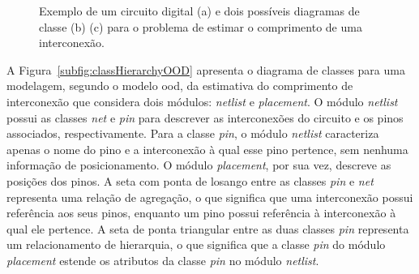 \begin{figure}[ht]
    \centering
    
    \hspace{0.5cm}
    \caption[Exemplo de um circuito digital]{Exemplo de um circuito digital (a) e dois possíveis diagramas de classe (b) (c) para o problema de estimar o comprimento de uma interconexão.}
    \label{fig:circuit_example}
\end{figure}

A Figura~\ref{subfig:classHierarchyOOD} apresenta o diagrama de classes para uma modelagem, segundo o modelo \ac{ood}, da estimativa do comprimento de interconexão que considera dois módulos: \textit{netlist} e \textit{placement}.
O módulo \textit{netlist} possui as classes \textit{net} e \textit{pin} para descrever as interconexões do circuito e os pinos associados, respectivamente.
Para a classe \textit{pin}, o módulo \textit{netlist} caracteriza apenas o nome do pino e a interconexão à qual esse pino pertence, sem nenhuma informação de posicionamento.
O módulo \textit{placement}, por sua vez, descreve as posições dos pinos.
A seta com ponta de losango entre as classes \textit{pin} e \textit{net} representa uma relação de agregação, o que significa que uma interconexão possui
referência aos seus pinos, enquanto um pino possui referência à interconexão à qual ele pertence. A seta de ponta triangular entre as duas classes \textit{pin} representa um relacionamento de hierarquia, o que significa que a classe \textit{pin} do módulo \textit{placement} estende os atributos da classe \textit{pin} no módulo \textit{netlist}.

